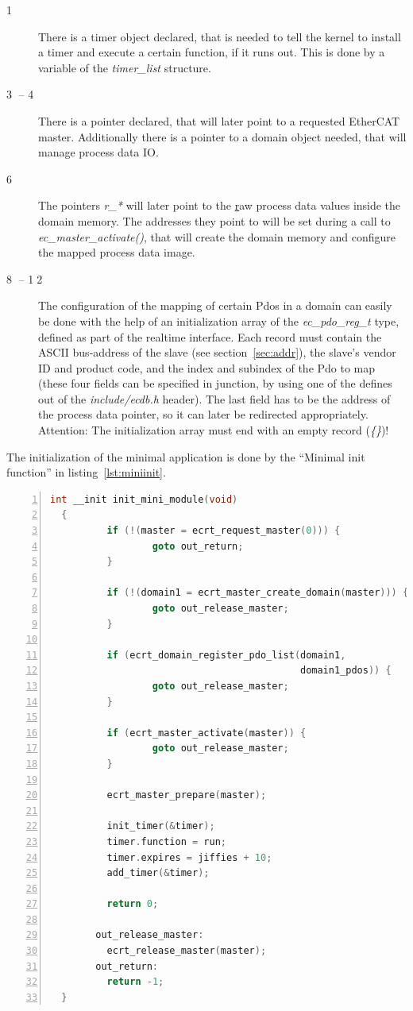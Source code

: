 \documentclass[a4paper,12pt,BCOR6mm,bibtotoc,idxtotoc]{scrbook}
\newcommand{\linenum}[1]{\normalfont\textcircled{\tiny #1}}
\begin{document}
\begin{description}
\item[\linenum{1}] There is a timer object
  declared, that is needed to tell the kernel to install a timer and
  execute a certain function, if it runs out. This is done by a
  variable of the \textit{timer\_list} structure.
\item[\linenum{3} -- \linenum{4}] There
  is a pointer declared, that will later point to a requested EtherCAT
  master.  Additionally there is a pointer to a domain object needed,
  that will manage process data IO.
\item[\linenum{6}] The pointers \textit{r\_*}
  will later point to the \underline{r}aw process data values inside
  the domain memory. The addresses they point to will be set during a
  call to \textit{ec\_\-master\_\-activate()}, that will create the
  domain memory and configure the mapped process data image.
\item[\linenum{8} -- \linenum{12}] The
  configuration of the mapping of certain Pdos in a domain can easily
  be done with the help of an initialization array of the
  \textit{ec\_pdo\_reg\_t} type, defined as part of the realtime
  interface. Each record must contain the ASCII bus-address of the
  slave (see section~\ref{sec:addr}), the slave's vendor ID and
  product code, and the index and subindex of the Pdo to map (these
  four fields can be specified in junction, by using one of the
  defines out of the \textit{include/ecdb.h} header). The last field
  has to be the address of the process data pointer, so it can later
  be redirected appropriately. Attention: The initialization array
  must end with an empty record (\textit{\{\}})!
\end{description}

The initialization of the minimal application is done by the ``Minimal init
function'' in listing~\ref{lst:miniinit}.

\begin{lstlisting}[gobble=2,language=C,numbers=left,caption={Minimal init
    function},label={lst:miniinit}]
  int __init init_mini_module(void)
  {
          if (!(master = ecrt_request_master(0))) {
                  goto out_return;
          }

          if (!(domain1 = ecrt_master_create_domain(master))) {
                  goto out_release_master;
          }

          if (ecrt_domain_register_pdo_list(domain1,
                                            domain1_pdos)) {
                  goto out_release_master;
          }

          if (ecrt_master_activate(master)) {
                  goto out_release_master;
          }

          ecrt_master_prepare(master);

          init_timer(&timer);
          timer.function = run;
          timer.expires = jiffies + 10;
          add_timer(&timer);

          return 0;

        out_release_master:
          ecrt_release_master(master);
        out_return:
          return -1;
  }
\end{lstlisting}
\end{document}
